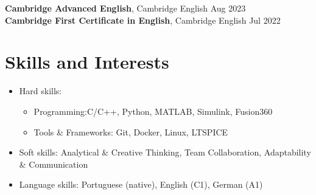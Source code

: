 \documentclass[11pt,a4paper]{article}
\begin{document}
\noindent \textbf{Cambridge Advanced English}, Cambridge English \hfill Aug 2023 \\
\noindent \textbf{Cambridge First Certificate in English}, Cambridge English \hfill Jul 2022

\section*{Skills and Interests}

\begin{itemize}[leftmargin=1.5em, labelsep=0.5em]
    \item[] Hard skills:
    \begin{itemize}[label=\tiny$\bullet$, leftmargin=1.5em, noitemsep, topsep=2pt]
        \item Programming:C/C++, Python, MATLAB, Simulink, Fusion360
        \item Tools \& Frameworks: Git, Docker, Linux, LTSPICE
    \end{itemize}
    \vspace{4pt}
    \item[] Soft skills: Analytical \& Creative Thinking, Team Collaboration, Adaptability \& Communication
    \item[] Language skills: Portuguese (native), English (C1), German (A1)
\end{itemize}
\end{document}
